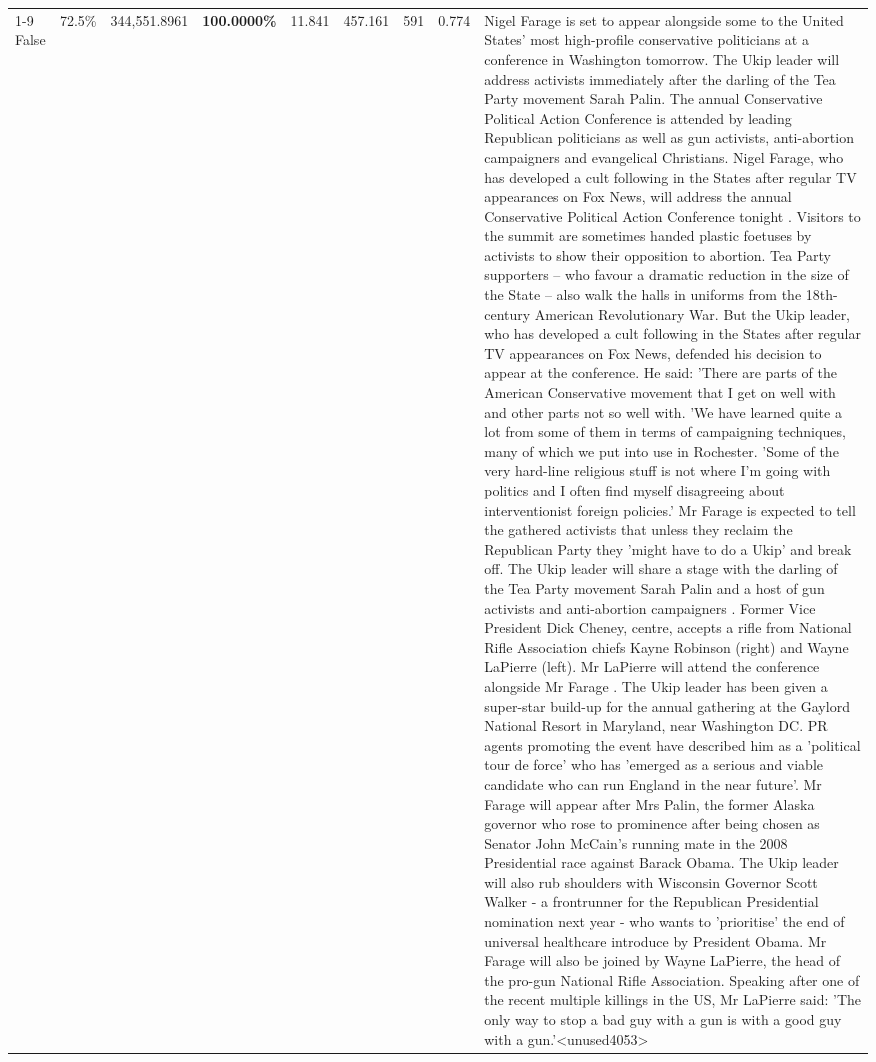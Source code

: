 \begin{table}[H]
\begin{tabular}{lllrlllll}
\cline{1-9}
False & 72.5\% & 344,551.8961 & \bfseries \color{red} 100.0000\% & 11.841 & 457.161 & 591 & 0.774 & Nigel Farage is set to appear alongside some to the United States' most high-profile conservative politicians at a conference in Washington tomorrow. The Ukip leader will address activists immediately after the darling of the Tea Party movement Sarah Palin. The annual Conservative Political Action Conference is attended by leading Republican politicians as well as gun activists, anti-abortion campaigners and evangelical Christians. Nigel Farage, who has developed a cult following in the States after regular TV appearances on Fox News, will address the annual Conservative Political Action Conference tonight . Visitors to the summit are sometimes handed plastic foetuses by activists to show their opposition to abortion. Tea Party supporters – who favour a dramatic reduction in the size of the State – also walk the halls in uniforms from the 18th-century American Revolutionary War. But the Ukip leader, who has developed a cult following in the States after regular TV appearances on Fox News, defended his decision to appear at the conference. He said: 'There are parts of the American Conservative movement that I get on well with and other parts not so well with. 'We have learned quite a lot from some of them in terms of campaigning techniques, many of which we put into use in Rochester. 'Some of the very hard-line religious stuff is not where I'm going with politics and I often find myself disagreeing about interventionist foreign policies.' Mr Farage is expected to tell the gathered activists that unless they reclaim the Republican Party they 'might have to do a Ukip' and break off. The Ukip leader will share a stage with the darling of the Tea Party movement Sarah Palin and a host of gun activists and anti-abortion campaigners . Former Vice President Dick Cheney, centre, accepts a rifle from National Rifle Association chiefs Kayne Robinson (right) and Wayne LaPierre (left). Mr LaPierre will attend the conference alongside Mr Farage . The Ukip leader has been given a super-star build-up for the annual gathering at the Gaylord National Resort in Maryland, near Washington DC. PR agents promoting the event have described him as a 'political tour de force' who has 'emerged as a serious and viable candidate who can run England in the near future'. Mr Farage will appear after Mrs Palin, the former Alaska governor who rose to prominence after being chosen as Senator John McCain's running mate in the 2008 Presidential race against Barack Obama. The Ukip leader will also rub shoulders with Wisconsin Governor Scott Walker - a frontrunner for the Republican Presidential nomination next year - who wants to 'prioritise' the end of universal healthcare introduce by President Obama. Mr Farage will also be joined by Wayne LaPierre, the head of the pro-gun National Rifle Association. Speaking after one of the recent multiple killings in the US, Mr LaPierre said: 'The only way to stop a bad guy with a gun is with a good guy with a gun.'<unused4053> \\

\end{tabular}
\end{table}
